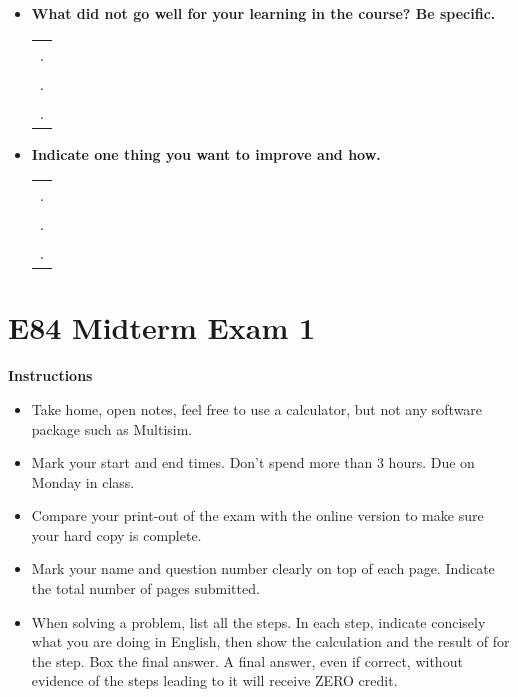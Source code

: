 \begin{itemize}
\begin{itemize}
\item {\bf What did not go well for your learning in the course? Be specific.}
\begin{tabular}{l}
.  \\
.  \\
.  \\
\end{tabular}
\vskip 0.9in

\item {\bf Indicate one thing you want to improve and how.}
\begin{tabular}{l}
.  \\
.  \\
.  \\
\end{tabular}
\vskip 0.9in

\end{itemize}

\end{itemize}


\section*{E84 Midterm Exam 1}

{\bf Instructions}
\begin{itemize}
\item Take home, open notes, feel free to use a calculator, but not any software package 
  such as Multisim. 
\item Mark your start and end times. Don't spend more than 3 hours. Due on Monday in class.
\item Compare your print-out of the exam with the online version to make
  sure your hard copy is complete.
\item Mark your name and question number clearly on top of each page.
  Indicate the total number of pages submitted.
\item When solving a problem, list all the steps. In each step, indicate
  concisely what you are doing in English, then show the calculation 
  and the result of for the step. Box the final answer.
  A final answer, even if correct, without evidence of the steps leading
  to it will receive ZERO credit.
\end{itemize}

